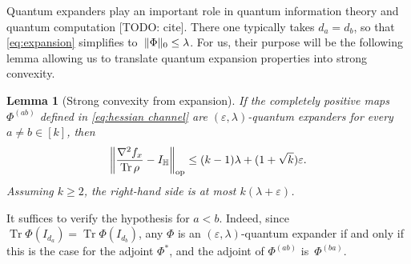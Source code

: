\documentclass[aos]{imsart}
\newtheorem{lemma}[theorem]{Lemma}
\theoremstyle{definition}
\numberwithin{equation}{section}
\DeclareMathOperator{\op}{op}
\DeclareMathOperator{\tr}{Tr}
\DeclarePairedDelimiter{\norm}{\lVert}{\rVert}
\renewcommand{\H}{{\mathbb{H}}}
\newcommand{\eps}{\varepsilon}
\newcommand{\TODO}[1]{{\color{blue}[TODO: #1]}}
\begin{document}
Quantum expanders play an important role in quantum information theory and quantum computation \TODO{cite}.
There one typically takes $d_a=d_b$, so that \cref{eq:expansion} simplifies to~$\norm{\Phi}_0 \leq \lambda$.
For us, their purpose will be the following lemma allowing us to translate quantum expansion properties into strong convexity.

\begin{lemma}[Strong convexity from expansion]\label{lem:expansion-convexity}
If the completely positive maps $\Phi^{(ab)}$ defined in \cref{eq:hessian channel} are $(\eps,\lambda)$-quantum expanders for every $a\neq b\in[k]$, then
\begin{align*}
  \norm*{\frac{\nabla^2 f_x}{\tr \rho} - I_\H}_{\op}
\leq (k-1)\lambda + (1 + \sqrt k) \eps.
\end{align*}
Assuming $k\geq2$, the right-hand side is at most $k (\lambda + \eps)$.
\end{lemma}
\noindent
It suffices to verify the hypothesis for $a<b$.
Indeed, since $\tr \Phi(I_{d_a}) = \tr \Phi(I_{d_b})$, any $\Phi$ is an $(\eps,\lambda)$-quantum expander if and only if this is the case for the adjoint $\Phi^*$, and the adjoint of $\Phi^{(ab)}$ is~$\Phi^{(ba)}$.
\end{document}
